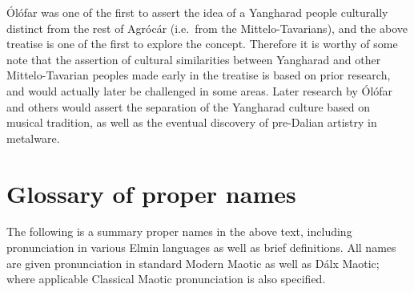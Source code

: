 \documentclass{article}
\begin{document}
Ólófar was one of the first to assert the idea of a Yangharad people culturally distinct from the rest of Agrócár (i.e.\ from the Mittelo-Tavarians), and the above treatise is one of the first to explore the concept. Therefore it is worthy of some note that the assertion of cultural similarities between Yangharad and other Mittelo-Tavarian peoples made early in the treatise is based on prior research, and would actually later be challenged in some areas. Later research by Ólófar and others would assert the separation of the Yangharad culture based on musical tradition, as well as the eventual discovery of pre-Dalian artistry in metalware.

\appendix
\pagebreak
\section{Glossary of proper names}

The following is a summary proper names in the above text, including pronunciation in various Elmin languages as well as brief definitions. All names are given pronunciation in standard Modern Maotic as well as Dálx Maotic; where applicable Classical Maotic pronunciation is also specified.
\end{document}
